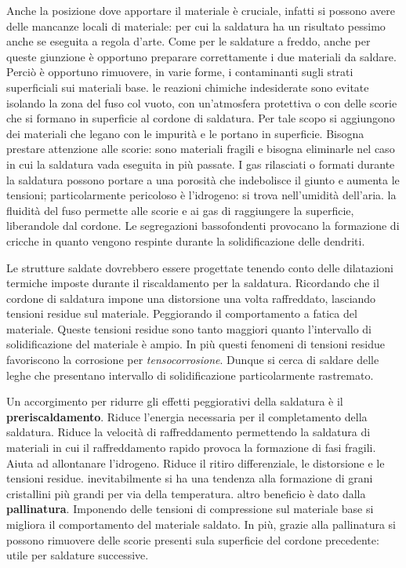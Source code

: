 Anche la posizione dove apportare il materiale è cruciale, infatti si possono avere delle mancanze locali di materiale: per cui la saldatura ha un risultato pessimo anche se eseguita a regola d'arte.
Come per le saldature a freddo, anche per queste giunzione è opportuno preparare correttamente i due materiali da saldare. Perciò è opportuno rimuovere, in varie forme, i contaminanti sugli strati superficiali sui materiali base.
le reazioni chimiche indesiderate sono evitate isolando la zona del fuso col vuoto, con un'atmosfera protettiva o con delle scorie che si formano in superficie al cordone di saldatura. Per tale scopo si aggiungono dei materiali che legano con le impurità e le portano in superficie.
Bisogna prestare attenzione alle scorie: sono materiali fragili e bisogna eliminarle nel caso in cui la saldatura vada eseguita in più passate.
I gas rilasciati o formati durante la saldatura possono portare a una porosità che indebolisce il giunto e aumenta le tensioni; particolarmente pericoloso è l'idrogeno: si trova nell'umidità dell'aria.
la fluidità del fuso permette alle scorie e ai gas di raggiungere la superficie, liberandole dal cordone.
Le segregazioni bassofondenti provocano la formazione di cricche in quanto vengono respinte durante la solidificazione delle dendriti.

Le strutture saldate dovrebbero essere progettate tenendo conto delle dilatazioni termiche imposte durante il riscaldamento per la saldatura.
Ricordando che il cordone di saldatura impone una distorsione una volta raffreddato, lasciando tensioni residue sul materiale. Peggiorando il comportamento a fatica del materiale.
Queste tensioni residue sono tanto maggiori quanto l'intervallo di solidificazione del materiale è ampio. 
In più questi fenomeni di tensioni residue favoriscono la corrosione per \textit{tensocorrosione}.
Dunque si cerca di saldare delle leghe che presentano intervallo di solidificazione particolarmente rastremato.

Un accorgimento per ridurre gli effetti peggiorativi della saldatura è il \textbf{preriscaldamento}.
Riduce l'energia necessaria per il completamento della saldatura.
Riduce la velocità di raffreddamento permettendo la saldatura di materiali in cui il raffreddamento rapido provoca la formazione di fasi fragili.
Aiuta ad allontanare l'idrogeno.
Riduce il ritiro differenziale, le distorsione e le tensioni residue.
inevitabilmente si ha una tendenza alla formazione di grani cristallini più grandi per via della temperatura.
altro beneficio è dato dalla \textbf{pallinatura}.
Imponendo delle tensioni di compressione sul materiale base si migliora il comportamento del materiale saldato.
In più, grazie alla pallinatura si possono rimuovere delle scorie presenti sula superficie del cordone precedente: utile per saldature successive.

